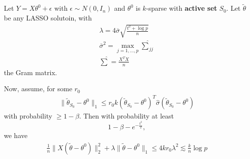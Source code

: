 \begin{thm}
  \label{defn:high_dimensional_statistics:1}
  Let $Y = X \theta^{0} + \epsilon$ with $\epsilon \sim N(0, I_{n})$
  and $\theta^{0}$ is $k$-sparse with \textbf{active set} $S_{0}$. Let
  $\tilde \theta$ be any LASSO solutoin, with
  \begin{align}
    \label{eq:118}
    \lambda = 4 \overline \sigma \sqrt{\frac{t^{2} + \log p}{n}} \\
    \overline \sigma^{2} = \max_{j = 1, \dots, p} \hat \sum_{jj} \\
    \hat \sum = \frac{X^{T} X}{n}
  \end{align} the Gram matrix.

  Now, assume, for some $r_{0}$
  \begin{align}
    \label{eq:119}
    \| \tilde \theta_{S_{0}} - \theta^{0} \|_{1} \leq r_{0} k (\tilde
    \theta_{S_{0}} - \theta^{0})^{T} \hat \sigma (\tilde
    \theta_{S_{0}} - \theta^{0})
  \end{align} with probability $\geq 1 - \beta$.  Then with
  probability at least
  \begin{equation}
    \label{eq:120}
    1 - \beta - e^{-\frac{t^{2}}{2}},
  \end{equation} we have
  \begin{align}
    \label{eq:121}
    \frac{1}{n} \| X (\tilde \theta - \theta^{0}) \|_{2}^{2} + \lambda
    \| \tilde \theta - \theta^{0} \|_{1} \leq  4 k r_{0} \lambda^{2} 
    \lesssim \frac{k}{n}\log p
  \end{align}
\end{thm}

